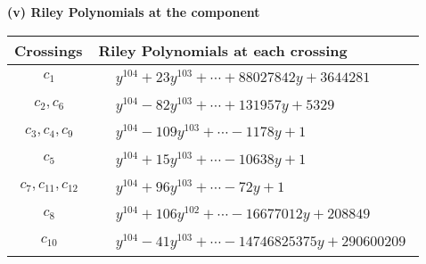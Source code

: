 \documentclass[1p]{elsarticle_modified}
\theoremstyle{definition}
\begin{document}
\flushleft \textbf{(v) Riley Polynomials at the component}\newline \\
\begin{tabular}{m{50pt}|m{274pt}}
Crossings & \hspace{64pt}Riley Polynomials at each crossing \\
\hline $$\begin{aligned}c_{1}\end{aligned}$$&$\begin{aligned}
&y^{104}+23 y^{103}+\cdots+88027842 y+3644281
\end{aligned}$\\
\hline $$\begin{aligned}c_{2},c_{6}\end{aligned}$$&$\begin{aligned}
&y^{104}-82 y^{103}+\cdots+131957 y+5329
\end{aligned}$\\
\hline $$\begin{aligned}c_{3},c_{4},c_{9}\end{aligned}$$&$\begin{aligned}
&y^{104}-109 y^{103}+\cdots-1178 y+1
\end{aligned}$\\
\hline $$\begin{aligned}c_{5}\end{aligned}$$&$\begin{aligned}
&y^{104}+15 y^{103}+\cdots-10638 y+1
\end{aligned}$\\
\hline $$\begin{aligned}c_{7},c_{11},c_{12}\end{aligned}$$&$\begin{aligned}
&y^{104}+96 y^{103}+\cdots-72 y+1
\end{aligned}$\\
\hline $$\begin{aligned}c_{8}\end{aligned}$$&$\begin{aligned}
&y^{104}+106 y^{102}+\cdots-16677012 y+208849
\end{aligned}$\\
\hline $$\begin{aligned}c_{10}\end{aligned}$$&$\begin{aligned}
&y^{104}-41 y^{103}+\cdots-14746825375 y+290600209
\end{aligned}$\\
\hline
\end{tabular}\\~\\
\end{document}
